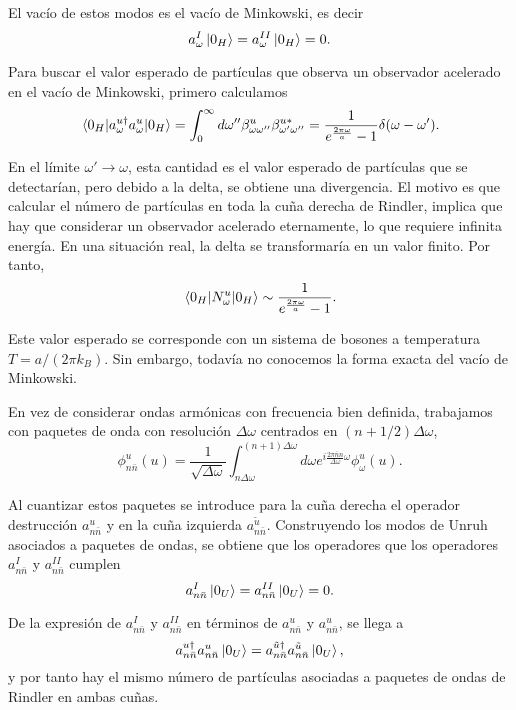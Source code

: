 El vacío de estos modos es el vacío de Minkowski, es decir
\begin{equation}
  a_\omega^I \ket{0_H} = a_\omega^{II}\ket{0_H} = 0.
\end{equation}
 
Para buscar el valor esperado de partículas que observa un observador acelerado
en el vacío de Minkowski, primero calculamos
\begin{equation}
  \ev{a_\omega^{u\dagger}a_\omega^u}{0_H} = \int_0^\infty d\omega'' \beta_{\omega\omega''}^u
  \beta_{\omega'\omega''}^{u*} = \frac{1}{e^{\frac{2\pi\omega}{a}}-1}\delta(\omega-\omega').
\end{equation}

En el límite $\omega'\to\omega$, esta cantidad es el valor esperado de partículas que se
detectarían, pero debido a la delta, se obtiene una divergencia.
El motivo es que calcular el número de partículas en toda la cuña derecha de Rindler, 
implica que hay que considerar un observador acelerado eternamente, lo que requiere infinita
energía.
En una situación real, la delta se transformaría en un valor finito.
Por tanto,
\begin{equation}
  \ev{N_\omega^u}{0_H} \sim \frac{1}{e^{\frac{2\pi\omega}{a}}-1}.
\end{equation}

Este valor esperado se corresponde con un sistema de bosones a temperatura $T=a/(2\pi k_B)$.
Sin embargo, todavía no conocemos la forma exacta del vacío de Minkowski.

En vez de considerar ondas armónicas con frecuencia bien definida, trabajamos con paquetes
de onda con resolución $\Delta \omega$ centrados en $(n+1/2)\Delta \omega$,
\begin{equation}
  \phi_{n\bar n}^u(u)=\frac{1}{\sqrt{\Delta \omega}}\int_{n\Delta\omega}^{(n+1)\Delta \omega}d\omega e^{i\frac{2\pi \bar n n}{\Delta \omega}\omega}
  \phi^u_\omega(u).
\end{equation}

Al cuantizar estos paquetes se introduce para la cuña derecha el operador destrucción $a_{n\bar n}^u$
y en la cuña izquierda $a_{n\bar n}^{\tilde u}$. 
Construyendo los modos de Unruh asociados a paquetes de ondas, se obtiene que
los operadores que los operadores $a_{n\bar n}^I$ y $a_{n\bar n}^{II}$ cumplen
\begin{equation}
  a_{n\bar n}^I\ket{0_U} = a_{n\bar n}^{II} \ket{0_U} = 0.
\end{equation}

De la expresión de $a_{n\bar n}^I$ y $a_{n\bar n}^{II}$ en términos de $a_{n\bar n}^u$ y $a_{n\bar n}^u$, se llega a 
\begin{equation}
  a_{n\bar n}^{u\dagger} a_{n\bar n}^u \ket{0_U} = a_{n\bar n}^{\tilde u\dagger}a_{n\bar n}^{\tilde u} \ket{0_U},
\end{equation}
y por tanto hay el mismo número de partículas asociadas a paquetes de ondas de Rindler en ambas
cuñas.

